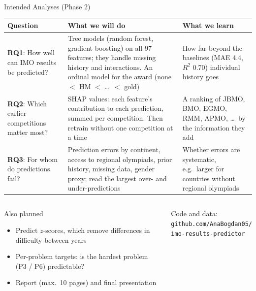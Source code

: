 \documentclass[aspectratio=169]{beamer}
\begin{document}
\begin{frame}{Intended Analyses (Phase 2)}
  \scriptsize
  \setlength{\tabcolsep}{4pt}
  \renewcommand{\arraystretch}{1.15}
  \begin{tabular}{L{3.3cm}L{5.4cm}L{4.6cm}}
    \toprule
    \textbf{Question} & \textbf{What we will do} & \textbf{What we learn} \\
    \midrule
    \textbf{RQ1}: How well can IMO results be predicted?
      & Tree models (random forest, gradient boosting) on all 97 features; they handle
        missing history and interactions. An ordinal model for the award (none $<$ HM
        $<$ \dots\ $<$ gold)
      & How far beyond the baselines (MAE 4.4, $R^2$ 0.70) individual history goes \\[4pt]
    \textbf{RQ2}: Which earlier competitions matter most?
      & SHAP values: each feature's contribution to each prediction, summed per
        competition. Then retrain without one competition at a time
      & A ranking of JBMO, BMO, EGMO, RMM, APMO, \dots\ by the information they add \\[4pt]
    \textbf{RQ3}: For whom do predictions fail?
      & Prediction errors by continent, access to regional olympiads, prior history,
        missing data, gender proxy; read the largest over- and under-predictions
      & Whether errors are systematic, e.g.\ larger for countries without
        regional olympiads \\
    \bottomrule
  \end{tabular}

  \vspace{2pt}
  \begin{columns}[T]
      \begin{block}{Also planned}
        \scriptsize
        \begin{itemize}\setlength{\itemsep}{1pt}
          \item Predict $z$-scores, which remove differences in difficulty between years
          \item Per-problem targets: is the hardest problem (P3 / P6) predictable?
          \item Report (max.\ 10 pages) and final presentation
        \end{itemize}
      \end{block}
      \vspace{14pt}
      \centering\scriptsize Code and data:\\
      \texttt{github.com/AnaBogdan05/\\imo-results-predictor}
  \end{columns}
\end{frame}
\end{document}
